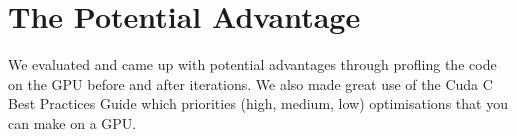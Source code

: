 \section*{The Potential Advantage}
We evaluated and came up with potential advantages through profling the code on the GPU before and after iterations.
We also made great use of the Cuda C Best Practices Guide\cite{best_practices} which priorities (high, medium, low) optimisations that you can make on a GPU.